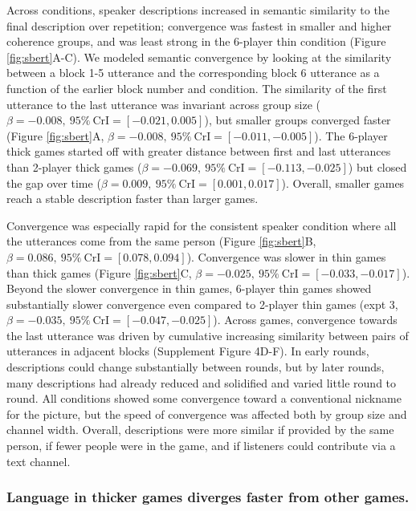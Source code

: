 \documentclass[
  english,
  a4paper,
]{article}
\begin{document}
Across conditions, speaker descriptions increased in semantic similarity to the final description over repetition; convergence was fastest in smaller and higher coherence groups, and was least strong in the 6-player thin condition (Figure \ref{fig:sbert}A-C).
We modeled semantic convergence by looking at the similarity between a block 1-5 utterance and the corresponding block 6 utterance as a function of the earlier block number and condition.
The similarity of the first utterance to the last utterance was invariant across group size (\(\beta=-0.008,\:95\%\:\mathrm{CrI}=[-0.021, 0.005]\)), but smaller groups converged faster (Figure \ref{fig:sbert}A, \(\beta=-0.008,\:95\%\:\mathrm{CrI}=[-0.011, -0.005]\)).
The 6-player thick games started off with greater distance between first and last utterances than 2-player thick games (\(\beta=-0.069,\:95\%\:\mathrm{CrI}=[-0.113, -0.025]\)) but closed the gap over time (\(\beta=0.009,\:95\%\:\mathrm{CrI}=[0.001, 0.017]\)).
Overall, smaller games reach a stable description faster than larger games.

Convergence was especially rapid for the consistent speaker condition where all the utterances come from the same person (Figure \ref{fig:sbert}B, \(\beta=0.086,\:95\%\:\mathrm{CrI}=[0.078, 0.094]\)).
Convergence was slower in thin games than thick games (Figure \ref{fig:sbert}C, \(\beta=-0.025,\:95\%\:\mathrm{CrI}=[-0.033, -0.017]\)).
Beyond the slower convergence in thin games, 6-player thin games showed substantially slower convergence even compared to 2-player thin games (expt 3, \(\beta=-0.035,\:95\%\:\mathrm{CrI}=[-0.047, -0.025]\)).
Across games, convergence towards the last utterance was driven by cumulative increasing similarity between pairs of utterances in adjacent blocks (Supplement Figure 4D-F). In early rounds, descriptions could change substantially between rounds, but by later rounds, many descriptions had already reduced and solidified and varied little round to round.
All conditions showed some convergence toward a conventional nickname for the picture, but the speed of convergence was affected both by group size and channel width. Overall, descriptions were more similar if provided by the same person, if fewer people were in the game, and if listeners could contribute via a text channel.

\hypertarget{language-in-thicker-games-diverges-faster-from-other-games.}{%
\subsubsection{Language in thicker games diverges faster from other games.}\label{language-in-thicker-games-diverges-faster-from-other-games.}}
\end{document}
